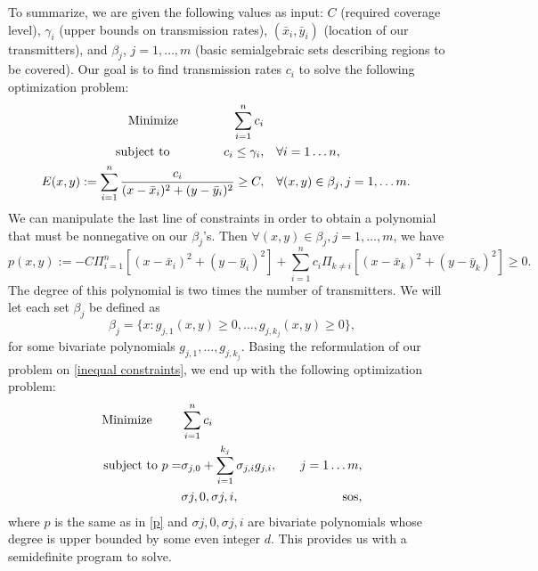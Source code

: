 	To summarize, we are given the following values as input: $C$ (required coverage level), $\gamma_i$ (upper bounds on transmission rates), $(\bar{x}_i , \bar{y}_i)$ (location of our transmitters), and $\beta_j$, $j = 1, \dots, m$ (basic semialgebraic sets describing regions to be covered). Our goal is to find transmission rates $c_i$ to solve the following optimization problem:
	\begin{equation}
		\begin{aligned}
		\textnormal{Minimize } \qquad \qquad \sum_{i=1}^{n} c_i \\
		\textnormal{subject to } \qquad \qquad c_i \leq \gamma_i, & \quad \forall i = 1 \dots n,\\
		E(x,y) := \sum_{i=1}^{n} \frac{c_i}{(x - \bar{x}_i)^2 + (y - \bar{y}_i)^2}  \geq C, & \quad \forall (x,y) \in \beta_j, j = 1, \dots m.
		\end{aligned}
	\end{equation}	
	We can manipulate the last line of constraints in order to obtain a polynomial that must be nonnegative on our $\beta_j$'s. Then $\forall (x,y) \in \beta_j, j = 1, \dots, m$, we have
	\begin{equation} \label{p}
		p(x, y) := -C \Pi_{i = 1}^{n} [(x - \bar{x}_i)^2 + (y - \bar{y}_i)^2] + \sum_{i = 1}^{n} c_i \Pi_{k \neq i} [(x - \bar{x}_k)^2 + (y - \bar{y}_k)^2] \geq 0.
	\end{equation}
	The degree of this polynomial is two times the number of transmitters. We will let each set $\beta_j$ be defined as
	$$
		\beta_j = \{x : g_{j, 1}(x,y) \geq 0, \dots, g_{j, k_{j}}(x,y) \geq 0 \}, 
	$$
	for some bivariate polynomials $g_{j, 1}, \dots, g_{j, k_{j}}$. Basing the reformulation of our problem on \eqref{inequal constraints}, we end up with the following optimization problem:
	\begin{equation}
		\begin{aligned}
		\textnormal{Minimize } \qquad &\sum_{i=1}^{n} c_i \\
		\textnormal{subject to } p =& \sigma_{j, 0} + \sum_{i=1}^{k_{j}} \sigma_{j, i} g_{j, i}, & \quad j = 1 \dots m,\\
		&\sigma{j, 0}, \sigma{j, i}, & \quad \textnormal{sos},
		\end{aligned}
	\end{equation}
	where $p$ is the same as in \eqref{p} and $\sigma{j, 0}, \sigma{j, i}$ are bivariate polynomials whose degree is upper bounded by some even integer $d$. This provides us with a semidefinite program to solve.
	
